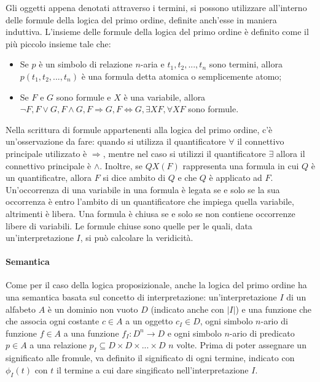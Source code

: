 Gli oggetti appena denotati attraverso i termini, si possono utilizzare all'interno delle formule della logica del primo ordine, definite anch'esse in maniera induttiva. L'insieme delle formule della logica del primo ordine è definito come il più piccolo insieme tale che:
\begin{itemize}
  \item Se \(p\) è un simbolo di relazione \(n\)-aria e \(t_1, t_2,...,t_n\) sono termini, allora \(p(t_1, t_2,...,t_n)\) è una formula detta atomica o semplicemente atomo;
  \item Se \(F\) e \(G\) sono formule e \(X\) è una variabile, allora \(\lnot F, F\vee G, F\wedge G, F \Rightarrow G, F \Leftrightarrow G, \exists XF, \forall XF\) sono formule.
\end{itemize}

Nella scrittura di formule appartenenti alla logica del primo ordine, c'è un'osservazione da fare: quando si utilizza il quantificatore \(\forall\) il connettivo principale utilizzato è \(\Rightarrow\), mentre nel caso si utilizzi il quantificatore \(\exists\) allora il connettivo principale è \(\wedge\). Inoltre, se \(QX(F)\) rappresenta una formula in cui \(Q\) è un quantificatre, allora \(F\) si dice ambito di \(Q\) e che \(Q\) è applicato ad \(F\). Un'occorrenza di una variabile in una formula è legata se e solo se la sua occorrenza è entro l'ambito di un quantificatore che impiega quella variabile, altrimenti è libera. Una formula è chiusa se e solo se non contiene occorrenze libere di variabili. Le formule chiuse sono quelle per le quali, data un'interpretazione \(I\), si può calcolare la veridicità.

\paragraph*{Semantica}
Come per il caso della logica proposizionale, anche la logica del primo ordine ha una semantica basata sul concetto di interpretazione: un'interpretazione \(I\) di un alfabeto \(A\) è un dominio non vuoto \(D\) (indicato anche con \(|I|\)) e una funzione che che associa ogni costante \(c\in A\) a un oggetto \(c_I \in D\), ogni simbolo \(n\)-ario di funzione \(f\in A\) a una funzione \(f_I:D^n\to D\) e ogni simbolo \(n\)-ario di predicato \(p\in A\) a una relazione \(p_I\subseteq D\times D\times ... \times D\) \(n\) volte. Prima di poter assegnare un significato alle fromule, va definito il significato di ogni termine, indicato con \(\phi_I(t)\) con \(t\) il termine a cui dare singificato nell'interpretazione \(I\). 

